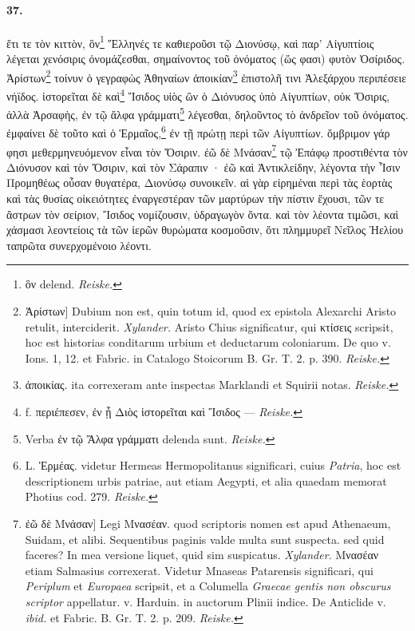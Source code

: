 \documentclass[a4paper, 11pt, oneside, polutonikogreek, german, landscape]{article}
\begin{document}
\paragraph{37.}
ἔτι τε τὸν κιττὸν, ὃν\footnote{ὃν delend. \emph{Reiske.}} Ἕλληνές τε καθιεροῦσι τῷ Διονύσῳ, καὶ παρ' Αἰγυπτίοις λέγεται χενόσιρις ὀνομάζεσθαι, σημαίνοντος τοῦ ὀνόματος (ὥς φασι) φυτὸν Ὀσίριδος. Ἀρίστων\footnote{Ἀρίστων] Dubium non est, quin totum id, quod ex epistola Alexarchi Aristo retulit, interciderit. \emph{Xylander.} Aristo Chius significatur, qui κτίσεις scripsit, hoc est historias conditarum urbium et deductarum coloniarum. De quo v. Ions. 1, 12. et Fabric. in Catalogo Stoicorum B. Gr. T. 2. p. 390. \emph{Reiske.}} τοίνυν ὁ γεγραφὼς Ἀθηναίων ἀποικίαν\footnote{ἀποικίας. ita correxeram ante inspectas Marklandi et Squirii notas. \emph{Reiske.}} ἐπιστολῆ τινι Ἀλεξάρχου περιπέσειε νήϊδος. ἱστορεῖται δὲ καὶ\footnote{f. περιέπεσεν, ἐν ᾗ Διὸς ἱστορεῖται καὶ Ἴσιδος --- \emph{Reiske.}} Ἴσιδος υἱὸς ὢν ὁ Διόνυσος ὑπὸ Αἰγυπτίων, οὐκ Ὄσιρις, ἀλλὰ Ἀρσαφὴς, ἐν τῷ ἄλφα γράμματι\footnote{Verba ἐν τῷ Ἄλφα γράμματι delenda sunt. \emph{Reiske.}} λέγεσθαι, δηλοῦντος τὸ ἀνδρεῖον τοῦ ὀνόματος. ἐμφαίνει δὲ τοῦτο καὶ ὁ Ἑρμαῖος,\footnote{L. Ἑρμέας. videtur Hermeas Hermopolitanus significari, cuius \emph{Patria}, hoc est descriptionem urbis patriae, aut etiam Aegypti, et alia quaedam memorat Photius cod. 279. \emph{Reiske.}} ἐν τῇ πρώτῃ περὶ τῶν Αἰγυπτίων. ὄμβριμον γάρ φησι μεθερμηνευόμενον εἶναι τὸν Ὄσιριν. ἐῶ δὲ Μνάσαν\footnote{ἐῶ δὲ Μνάσαν] Legi Μνασέαν. quod scriptoris nomen est apud Athenaeum, Suidam, et alibi. Sequentibus paginis valde multa sunt suspecta. sed quid faceres? In mea versione liquet, quid sim suspicatus. \emph{Xylander.} Μνασέαν etiam Salmasius correxerat. Videtur Mnaseas Patarensis significari, qui \emph{Periplum} et \emph{Europaea} scripsit, et a Columella \emph{Graecae gentis non obscurus scriptor} appellatur. v. Harduin. in auctorum Plinii indice. De Anticlide v. \emph{ibid.} et Fabric. B. Gr. T. 2. p. 209. \emph{Reiske.}} τῷ Ἐπάφῳ προστιθέντα τὸν Διόνυσον καὶ τὸν Ὄσιριν, καὶ τὸν Σάραπιν · ἐῶ καὶ Ἀντικλείδην, λέγοντα τὴν Ἶσιν Προμηθέως οὖσαν θυγατέρα, Διονύσῳ συνοικεῖν. αἱ γὰρ εἰρημέναι περὶ τὰς ἑορτὰς καὶ τὰς θυσίας οἰκειότητες ἐναργεστέραν τῶν μαρτύρων τὴν πίστιν ἔχουσι, τῶν τε ἄστρων τὸν σείριον, Ἴσιδος νομίζουσιν, ὑδραγωγὸν ὄντα. καὶ τὸν λέοντα τιμῶσι, καὶ χάσμασι λεοντείοις τὰ τῶν ἱερῶν θυρώματα κοσμοῦσιν, ὅτι πλημμυρεῖ Νεῖλος Ἠελίου ταπρῶτα συνερχομένοιο λέοντι.
\end{document}

